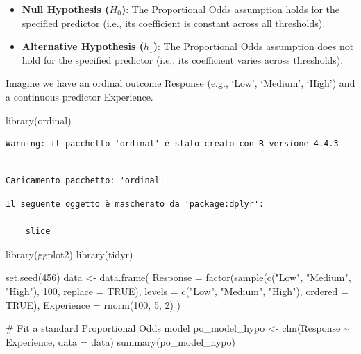 \documentclass[
  letterpaper,
  DIV=11,
  numbers=noendperiod]{scrartcl}
\newenvironment{Shaded}{\begin{snugshade}}{\end{snugshade}}
\newcommand{\AttributeTok}[1]{\textcolor[rgb]{0.40,0.45,0.13}{#1}}
\newcommand{\CommentTok}[1]{\textcolor[rgb]{0.37,0.37,0.37}{#1}}
\newcommand{\ConstantTok}[1]{\textcolor[rgb]{0.56,0.35,0.01}{#1}}
\newcommand{\DecValTok}[1]{\textcolor[rgb]{0.68,0.00,0.00}{#1}}
\newcommand{\FunctionTok}[1]{\textcolor[rgb]{0.28,0.35,0.67}{#1}}
\newcommand{\NormalTok}[1]{\textcolor[rgb]{0.00,0.23,0.31}{#1}}
\newcommand{\OtherTok}[1]{\textcolor[rgb]{0.00,0.23,0.31}{#1}}
\newcommand{\SpecialCharTok}[1]{\textcolor[rgb]{0.37,0.37,0.37}{#1}}
\newcommand{\StringTok}[1]{\textcolor[rgb]{0.13,0.47,0.30}{#1}}
\begin{document}
\begin{itemize}
\item
  \textbf{Null Hypothesis (\(H_0\))}: The Proportional Odds assumption
  holds for the specified predictor (i.e., its coefficient is constant
  across all thresholds).
\item
  \textbf{Alternative Hypothesis (\(h_1\))}: The Proportional Odds
  assumption does not hold for the specified predictor (i.e., its
  coefficient varies across thresholds).
\end{itemize}

Imagine we have an ordinal outcome Response (e.g., `Low', `Medium',
`High') and a continuous predictor Experience.

\begin{Shaded}
\begin{Highlighting}[]
\FunctionTok{library}\NormalTok{(ordinal) }
\end{Highlighting}
\end{Shaded}

\begin{verbatim}
Warning: il pacchetto 'ordinal' è stato creato con R versione 4.4.3
\end{verbatim}

\begin{verbatim}

Caricamento pacchetto: 'ordinal'
\end{verbatim}

\begin{verbatim}
Il seguente oggetto è mascherato da 'package:dplyr':

    slice
\end{verbatim}

\begin{Shaded}
\begin{Highlighting}[]
\FunctionTok{library}\NormalTok{(ggplot2) }
\FunctionTok{library}\NormalTok{(tidyr)   }

\FunctionTok{set.seed}\NormalTok{(}\DecValTok{456}\NormalTok{)}
\NormalTok{data }\OtherTok{\textless{}{-}} \FunctionTok{data.frame}\NormalTok{(}
  \AttributeTok{Response =} \FunctionTok{factor}\NormalTok{(}\FunctionTok{sample}\NormalTok{(}\FunctionTok{c}\NormalTok{(}\StringTok{"Low"}\NormalTok{, }\StringTok{"Medium"}\NormalTok{, }\StringTok{"High"}\NormalTok{), }\DecValTok{100}\NormalTok{, }\AttributeTok{replace =} \ConstantTok{TRUE}\NormalTok{),}
                    \AttributeTok{levels =} \FunctionTok{c}\NormalTok{(}\StringTok{"Low"}\NormalTok{, }\StringTok{"Medium"}\NormalTok{, }\StringTok{"High"}\NormalTok{), }\AttributeTok{ordered =} \ConstantTok{TRUE}\NormalTok{),}
  \AttributeTok{Experience =} \FunctionTok{rnorm}\NormalTok{(}\DecValTok{100}\NormalTok{, }\DecValTok{5}\NormalTok{, }\DecValTok{2}\NormalTok{)}
\NormalTok{)}

\CommentTok{\# Fit a standard Proportional Odds model}
\NormalTok{po\_model\_hypo }\OtherTok{\textless{}{-}} \FunctionTok{clm}\NormalTok{(Response }\SpecialCharTok{\textasciitilde{}}\NormalTok{ Experience, }\AttributeTok{data =}\NormalTok{ data)}
\FunctionTok{summary}\NormalTok{(po\_model\_hypo)}
\end{Highlighting}
\end{Shaded}
\end{document}
